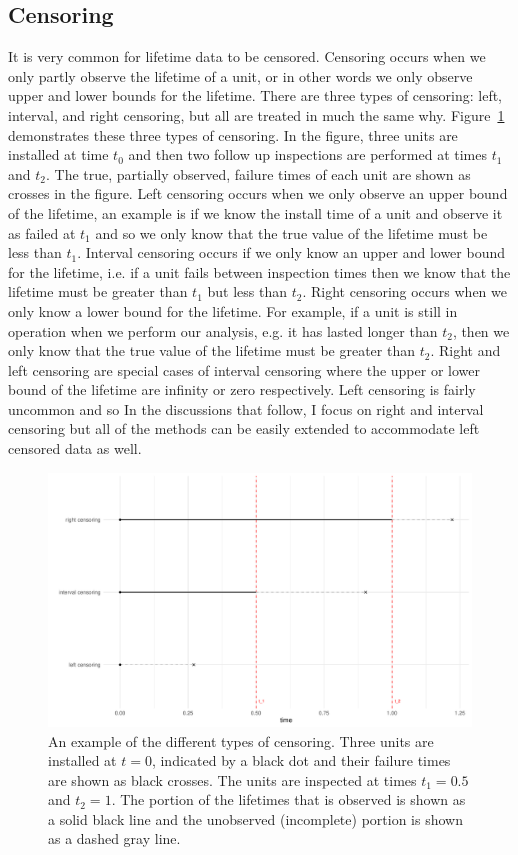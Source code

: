 \subsection{Censoring}

It is very common for lifetime data to be censored. Censoring occurs when we only partly observe the lifetime of a unit, or in other words we only observe upper and lower bounds for the lifetime. There are three types of censoring: left, interval, and right censoring, but all are treated in much the same why. Figure~\ref{fig:cense_examp} demonstrates these three types of censoring. In the figure, three units are installed at time $t_0$ and then two follow up inspections are performed at times $t_1$ and $t_2$. The true, partially observed, failure times of each unit are shown as crosses in the figure. Left censoring occurs when we only observe an upper bound of the lifetime, an example is if we know the install time of a unit and observe it as failed at $t_1$ and so we only know that the true value of the lifetime must be less than $t_1$. Interval censoring occurs if we only know an upper and lower bound for the lifetime, i.e. if a unit fails between inspection times then we know that the lifetime must be greater than $t_1$ but less than $t_2$. Right censoring occurs when we only know a lower bound for the lifetime. For example, if a unit is still in operation when we perform our analysis, e.g. it has lasted longer than $t_2$, then we only know that the true value of the lifetime must be greater than $t_2$. Right and left censoring are special cases of interval censoring where the upper or lower bound of the lifetime are infinity or zero respectively. Left censoring is fairly uncommon and so In the discussions that follow, I focus on right and interval censoring but all of the methods can be easily extended to accommodate left censored data as well.

\begin{figure}[h]
    \centering
    \includegraphics[width=1\textwidth]{./figures/censoring_example.pdf}
    \caption{An example of the different types of censoring. Three units are installed at $t = 0$, indicated by a black dot and their failure times are shown as black crosses. The units are inspected at times $t_1 = 0.5$ and $t_2 = 1$. The portion of the lifetimes that is observed is shown as a solid black line and the unobserved (incomplete) portion is shown as a dashed gray line.}
    \label{fig:cense_examp}
\end{figure}

